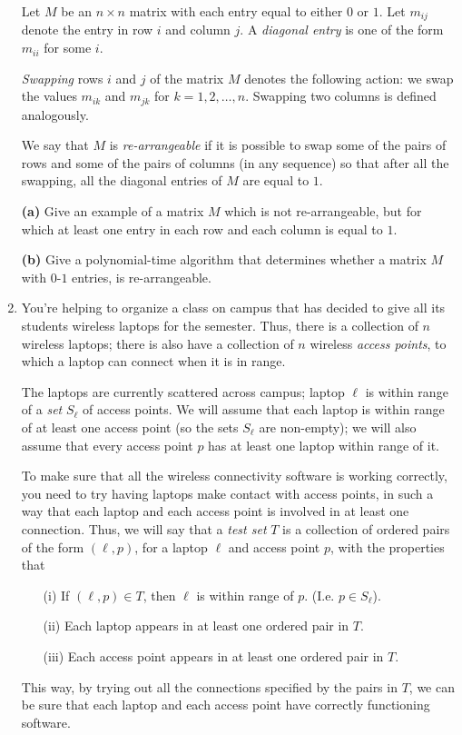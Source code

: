 \documentclass[12pt]{article}
\begin{document}
\begin{enumerate}
Let $M$ be an $n \times n$ matrix with each entry equal to
either $0$ or $1$.
Let $m_{ij}$ denote the entry in row $i$ and column $j$.
A {\em diagonal entry} is one of the form $m_{ii}$ for some $i$.

{\em Swapping} rows $i$ and $j$ of the matrix $M$ denotes
the following action:
we swap the values $m_{ik}$ and $m_{jk}$ for $k = 1, 2, \ldots, n$.
Swapping two columns is defined analogously.

We say that $M$ is {\em re-arrangeable} if it is possible
to swap some of the pairs of rows and some of the pairs of
columns (in any sequence) so that after all the swapping,
all the diagonal entries of $M$ are equal to $1$.

{\bf (a)}
Give an example of a matrix $M$ which is not re-arrangeable,
but for which at least one entry in each row and each column
is equal to $1$.

{\bf (b)}
Give a polynomial-time algorithm that determines
whether a matrix $M$ with $0$-$1$ entries,
is re-arrangeable.


\item

You're helping to organize a class on campus that
has decided to give all its students wireless laptops for the semester.
Thus, there is a collection of $n$ wireless laptops;
there is also have a collection of $n$ wireless {\em access points},
to which a laptop can connect when it is in range.

The laptops are currently scattered across campus;
laptop $\ell$ is within range of a {\em set} $S_\ell$ of access points.
We will assume that each laptop is within range of at least
one access point (so the sets $S_\ell$ are non-empty);
we will also assume that every access point $p$ has at least
one laptop within range of it.

To make sure that all the wireless connectivity software is
working correctly, you need to try having laptops
make contact with access points, in such a way that
each laptop and each access point is involved in at least one connection.
Thus, we will say that a {\em test set} $T$ is a collection
of ordered pairs of the form $(\ell,p)$, for a laptop $\ell$
and access point $p$, with the properties that
\begin{itemize}
\item[(i)] If $(\ell,p) \in T$, then $\ell$ is within range of
$p$.  (I.e. $p \in S_\ell$).
\item[(ii)] Each laptop appears in at least one ordered pair in $T$.
\item[(iii)] Each access point appears in at least one ordered pair in $T$.
\end{itemize}
This way, by trying out all the connections specified by the pairs in $T$,
we can be sure that each laptop and each access point
have correctly functioning software.


\end{enumerate}
\end{document}
